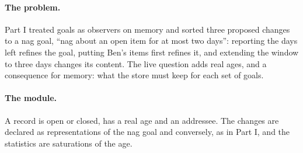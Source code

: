\documentclass[11pt]{article}
\theoremstyle{definition}
\theoremstyle{plain}
\begin{document}
\paragraph{The problem.} Part I treated goals as observers on memory and sorted three proposed
changes to a nag goal, ``nag about an open item for at most two days'': reporting the days left
refines the goal, putting Ben's items first refines it, and extending the window to three days
changes its content. The live question adds real ages, and a consequence for memory: what the store
must keep for each set of goals.

\paragraph{The module.} A record is open or closed, has a real age and an addressee. The changes are
declared as representations of the nag goal and conversely, as in Part I, and the statistics are
saturations of the age.
\end{document}
